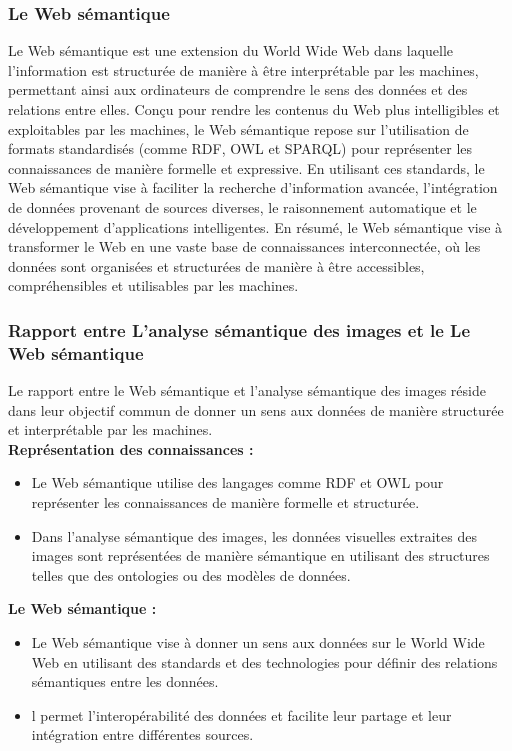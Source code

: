 \documentclass{article}
\begin{document}
	\subsubsection{Le Web sémantique}
	\quad Le Web sémantique est une extension du World Wide Web dans laquelle l'information est structurée de manière à être interprétable par les machines, permettant ainsi aux ordinateurs de comprendre le sens des données et des relations entre elles. Conçu pour rendre les contenus du Web plus intelligibles et exploitables par les machines, le Web sémantique repose sur l'utilisation de formats standardisés (comme RDF, OWL et SPARQL) pour représenter les connaissances de manière formelle et expressive. En utilisant ces standards, le Web sémantique vise à faciliter la recherche d'information avancée, l'intégration de données provenant de sources diverses, le raisonnement automatique et le développement d'applications intelligentes. En résumé, le Web sémantique vise à transformer le Web en une vaste base de connaissances interconnectée, où les données sont organisées et structurées de manière à être accessibles, compréhensibles et utilisables par les machines.
	
	\subsubsection{Rapport entre L'analyse sémantique des images et le Le Web sémantique}
	Le rapport entre le Web sémantique et l'analyse sémantique des images réside dans leur objectif commun de donner un sens aux données de manière structurée et interprétable par les machines. \\
	
	\textemdash \textbf{ Représentation des connaissances :}
	\begin{itemize}
		\item Le Web sémantique utilise des langages comme RDF et OWL pour représenter les connaissances de manière formelle et structurée.
		\item Dans l'analyse sémantique des images, les données visuelles extraites des images sont représentées de manière sémantique en utilisant des structures telles que des ontologies ou des modèles de données.
	\end{itemize}

	\textemdash \textbf{ Le Web sémantique :}
	\begin{itemize}
		\item Le Web sémantique vise à donner un sens aux données sur le World Wide Web en utilisant des standards et des technologies pour définir des relations sémantiques entre les données.
		\item l permet l'interopérabilité des données et facilite leur partage et leur intégration entre différentes sources.
	\end{itemize}
\end{document}

